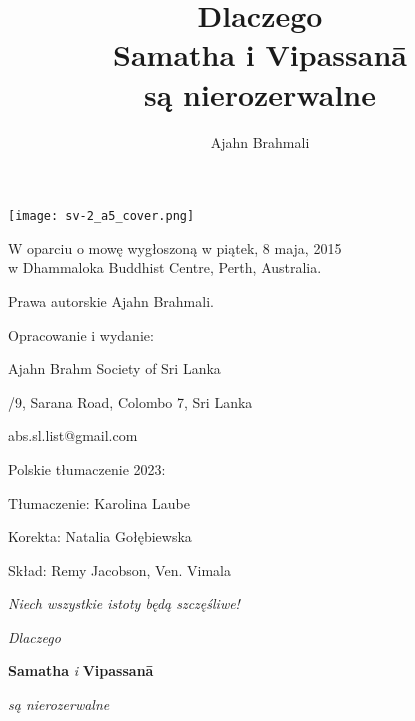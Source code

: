 \documentclass[12pt,openany]{book}
\title{ Dlaczego \protect\\ Samatha i Vipassanā \protect\\ są nierozerwalne}
\author{Ajahn Brahmali}
\date{}
\begin{document}
\frontmatter
\pagestyle{empty}

\hspace*{-156mm}
\texttt{[image: sv-2\_a5\_cover.png]}





\restoregeometry

\begin{center}\end{center}

\vspace{4em}
{\small
\noindent W oparciu o mowę wygłoszoną w piątek, 8 maja, 2015 \\w Dhammaloka Buddhist Centre, Perth, Australia.

\bigskip

\noindent Prawa autorskie Ajahn Brahmali.
\bigskip

\noindent Opracowanie i wydanie:

\medskip

\noindent Ajahn Brahm Society of Sri Lanka

/9, Sarana Road, Colombo 7, Sri Lanka

\noindent abs.sl.list@gmail.com

\bigskip

\noindent Polskie tłumaczenie 2023:

\medskip

\noindent Tłumaczenie: Karolina Laube

\noindent Korekta: Natalia Gołębiewska

\noindent Skład: Remy Jacobson, Ven. Vimala

}

\vfill

\begin{center}
\textit{ Niech wszystkie istoty będą szczęśliwe!}

\end{center}
\vfill

\newpage

\begin{center}\end{center}
\begin{center}

\vfill

{\huge \textit{Dlaczego} 

\medskip

\textbf{Samatha} \textit{i} \textbf{Vipassanā} 

\bigskip

\textit{są nierozerwalne}}

\vfill


\vfill
\end{center}
\end{document}

